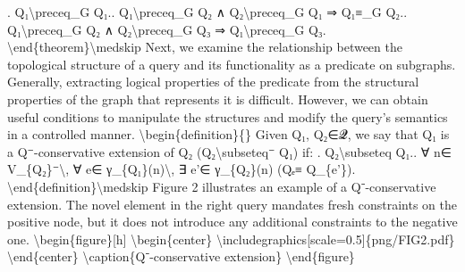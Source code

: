 \documentclass{article}%
\begin{document}
. Q₁\textbackslash{}preceq\_G Q₁.. Q₁\textbackslash{}preceq\_G Q₂ ∧ Q₂\textbackslash{}preceq\_G Q₁ ⇒ Q₁≡\_G Q₂.. Q₁\textbackslash{}preceq\_G Q₂ ∧ Q₂\textbackslash{}preceq\_G Q₃ ⇒ Q₁\textbackslash{}preceq\_G Q₃.\newline%
\textbackslash{}end\{theorem\}\textbackslash{}medskip\newline%
\newline%
Next, we examine the relationship between the topological structure of a query and its functionality as a predicate on subgraphs. Generally, extracting logical properties of the predicate from the structural properties of the graph that represents it is difficult. However, we can obtain useful conditions to manipulate the structures and modify the query's semantics in a controlled manner.\newline%
\newline%
\textbackslash{}begin\{definition\}\{\}\newline%
Given Q₁, Q₂∈𝓠, we say that Q₁ is a Q⁻{-}conservative extension of Q₂ (Q₂\textbackslash{}subseteq⁻ Q₁) if:\newline%
. Q₂\textbackslash{}subseteq Q₁.. ∀ n∈ V\_\{Q₂\}⁻\textbackslash{}, ∀ e∈ γ\_\{Q₁\}(n)\textbackslash{}, ∃ e'∈ γ\_\{Q₂\}(n) (Qₑ≡ Q\_\{e'\}).\newline%
\textbackslash{}end\{definition\}\textbackslash{}medskip\newline%
\newline%
Figure 2 illustrates an example of a Q⁻{-}conservative extension. The novel element in the right query mandates fresh constraints on the positive node, but it does not introduce any additional constraints to the negative one.\newline%
\newline%
\textbackslash{}begin\{figure\}{[}h{]}\newline%
\textbackslash{}begin\{center\}\newline%
\textbackslash{}includegraphics{[}scale=0.5{]}\{png/FIG2.pdf\}\newline%
\textbackslash{}end\{center\}\newline%
\textbackslash{}caption\{Q⁻{-}conservative extension\}\newline%
\textbackslash{}end\{figure\}\newline%
\end{document}
